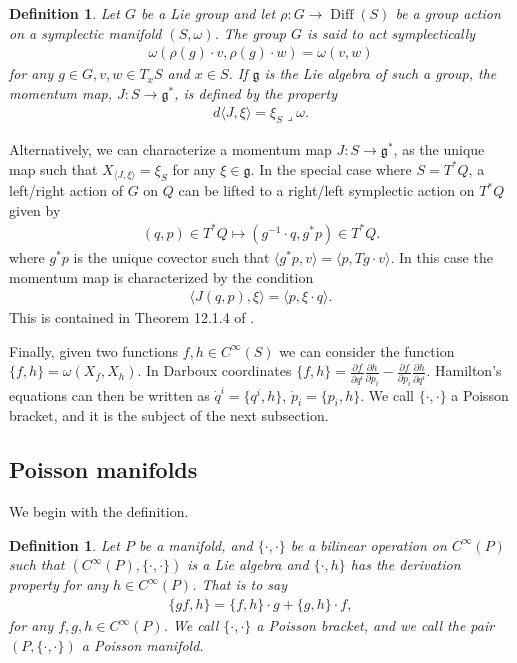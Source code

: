 \documentclass[12pt]{amsart}
\newcommand{\pder}[2]{\ensuremath{\frac{\partial #1}{\partial #2}}}
\newtheorem{defn}[thm]{Definition}
\DeclareMathOperator{\Diff}{Diff}
\begin{document}
\begin{defn}
  Let $G$ be a Lie group and let $\rho:G \to \Diff(S)$ be a group action on a symplectic manifold $(S,\omega)$.
  The group $G$ is said to \emph{act symplectically}
  \begin{align*}
    \omega( \rho( g ) \cdot v , \rho(g) \cdot w) = \omega(v,w)
  \end{align*}
  for any $g \in G, v,w \in T_xS$ and $x \in S$.
  If $\mathfrak{g}$ is the Lie algebra of such a group,
  the \emph{momentum map}, $J:S \to \mathfrak{g}^*$,
  is defined by the property
  \begin{align*}
    d \langle J , \xi \rangle = \xi_S \lrcorner \omega.
  \end{align*}
\end{defn}

Alternatively, we can characterize a momentum map $J: S \to \mathfrak{g}^*$, as the unique map such that $X_{\langle J , \xi \rangle} = \xi_S$ for any $\xi \in \mathfrak{g}$.
In the special case where $S = T^*Q$, a left/right action of $G$ on $Q$ can be lifted to a right/left symplectic action on $T^*Q$ given by
\begin{align*}
  (q,p) \in T^*Q \mapsto (g^{-1} \cdot q , g^* p) \in T^*Q.
\end{align*}
where $g^*p$ is the unique covector such that $\langle g^*p , v \rangle = \langle p , Tg \cdot v \rangle$.
In this case the momentum map is characterized by the condition
\begin{align}
  \langle J(q,p) , \xi \rangle = \langle p , \xi \cdot q \rangle.
  \label{eq:cotangent_momap}
\end{align}
This is contained in Theorem 12.1.4 of \cite{MandS}.

Finally, given two functions $f,h \in C^{\infty}(S)$ we can consider the function $\{ f,h\} = \omega( X_f, X_h)$.
In Darboux coordinates $\{ f , h \} = \pder{f}{q^i} \pder{h}{p_i} - \pder{f}{p_i} \pder{h}{q^i}$.
Hamilton's equations can then be written as $\dot{q}^i = \{ q^i , h \}$,
$\dot{p}_i = \{ p_i , h \}$.
We call $\{ \cdot , \cdot \}$ a Poisson bracket, and it is the subject of
the next subsection.

\subsection{Poisson manifolds}
\label{sec:Poisson}
We begin with the definition.

\begin{defn} \label{defn:Poisson}
  Let $P$ be a manifold, and $\{ \cdot , \cdot \}$ be a bilinear
  operation on $C^{\infty}(P)$ such that 
  $( C^{\infty}(P) , \{ \cdot , \cdot \} )$ is a Lie algebra
  and $\{ \cdot , h \}$ has the derivation property for any $h \in C^{\infty}(P)$.
  That is to say
  \begin{align*}
    \{ gf , h \} = \{ f , h \} \cdot g + \{ g , h \} \cdot f,
  \end{align*}
  for any $f,g,h \in C^{\infty}(P)$.
  We call $\{ \cdot , \cdot \}$ a \emph{Poisson bracket},
  and we call the pair $(P, \{ \cdot , \cdot \})$ a Poisson manifold.
\end{defn}
\end{document}
